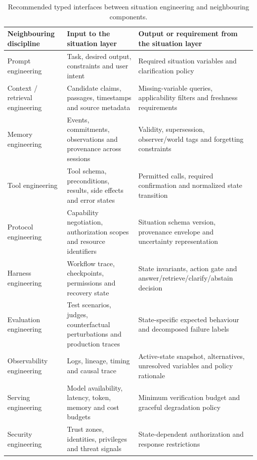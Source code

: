 \documentclass[Numbered]{sn-jnl}
\begin{document}
\begin{table}[!ht]
\centering
\caption{Recommended typed interfaces between situation engineering and neighbouring components.}
\label{stab:interfaces}
\begin{tabularx}{\linewidth}{p{3.2cm}p{4.2cm}X}
\toprule
Neighbouring discipline & Input to the situation layer & Output or requirement from the situation layer \\
\midrule
Prompt engineering & Task, desired output, constraints and user intent & Required situation variables and clarification policy \\
Context / retrieval engineering & Candidate claims, passages, timestamps and source metadata & Missing-variable queries, applicability filters and freshness requirements \\
Memory engineering & Events, commitments, observations and provenance across sessions & Validity, supersession, observer/world tags and forgetting constraints \\
Tool engineering & Tool schema, preconditions, results, side effects and error states & Permitted calls, required confirmation and normalized state transition \\
Protocol engineering & Capability negotiation, authorization scopes and resource identifiers & Situation schema version, provenance envelope and uncertainty representation \\
Harness engineering & Workflow trace, checkpoints, permissions and recovery state & State invariants, action gate and answer/retrieve/clarify/abstain decision \\
Evaluation engineering & Test scenarios, judges, counterfactual perturbations and production traces & State-specific expected behaviour and decomposed failure labels \\
Observability engineering & Logs, lineage, timing and causal trace & Active-state snapshot, alternatives, unresolved variables and policy rationale \\
Serving engineering & Model availability, latency, token, memory and cost budgets & Minimum verification budget and graceful degradation policy \\
Security engineering & Trust zones, identities, privileges and threat signals & State-dependent authorization and response restrictions \\
\bottomrule
\end{tabularx}
\end{table}
\end{document}
